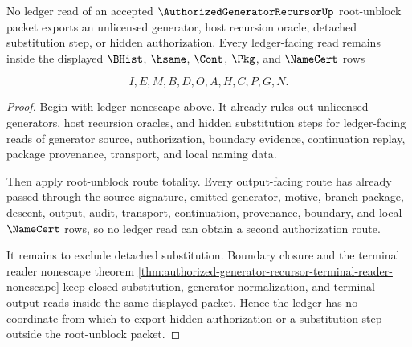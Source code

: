 \begin{theorem}
\label{thm:authorized-generator-recursor-root-unblock-ledger-nonescape}
No ledger read of an accepted $\AuthorizedGeneratorRecursorUp$ root-unblock packet exports an unlicensed generator, host recursion oracle, detached substitution step, or hidden authorization. Every ledger-facing read remains inside the displayed $\BHist$, $\hsame$, $\Cont$, $\Pkg$, and $\NameCert$ rows

$$
I,E,M,B,D,O,A,H,C,P,G,N.
$$
\end{theorem}
\begin{proof}
Begin with ledger nonescape above. It already rules out unlicensed generators, host recursion oracles, and hidden substitution steps for ledger-facing reads of generator source, authorization, boundary evidence, continuation replay, package provenance, transport, and local naming data.

Then apply root-unblock route totality. Every output-facing route has already passed through the source signature, emitted generator, motive, branch package, descent, output, audit, transport, continuation, provenance, boundary, and local $\NameCert$ rows, so no ledger read can obtain a second authorization route.

It remains to exclude detached substitution. Boundary closure and the terminal reader nonescape theorem \autoref{thm:authorized-generator-recursor-terminal-reader-nonescape} keep closed-substitution, generator-normalization, and terminal output reads inside the same displayed packet. Hence the ledger has no coordinate from which to export hidden authorization or a substitution step outside the root-unblock packet.
\end{proof}

